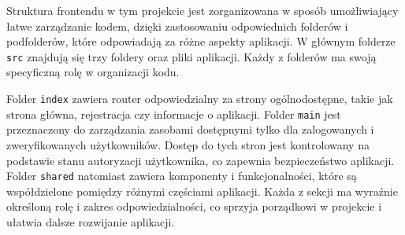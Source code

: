 \documentclass[twoside]{projektInzynierskiMS1}
\begin{document}
\noindent
Struktura frontendu w tym projekcie jest zorganizowana w sposób umożliwiający łatwe zarządzanie kodem, dzięki zastosowaniu odpowiednich folderów i podfolderów, które odpowiadają za różne aspekty aplikacji. W głównym folderze \texttt{src} znajdują się trzy foldery oraz pliki aplikacji. Każdy z folderów ma swoją specyficzną rolę w organizacji kodu.

\vspace{0.5cm}
\noindent
\begin{minipage}[t]{0.45\textwidth} 
    \vspace{0pt} 
    \justifying 
    \noindent 
    Folder \texttt{index} zawiera router odpowiedzialny za strony ogólnodostępne, takie jak strona główna, rejestracja czy informacje o aplikacji. Folder \texttt{main} jest przeznaczony do zarządzania zasobami dostępnymi tylko dla zalogowanych i zweryfikowanych użytkowników. Dostęp do tych stron jest kontrolowany na podstawie stanu autoryzacji użytkownika, co zapewnia bezpieczeństwo aplikacji. Folder \texttt{shared} natomiast zawiera komponenty i funkcjonalności, które są współdzielone pomiędzy różnymi częściami aplikacji. Każda z sekcji ma wyraźnie określoną rolę i zakres odpowiedzialności, co sprzyja porządkowi w projekcie i ułatwia dalsze rozwijanie aplikacji.
\end{minipage} 
\hfill 
\end{document}
